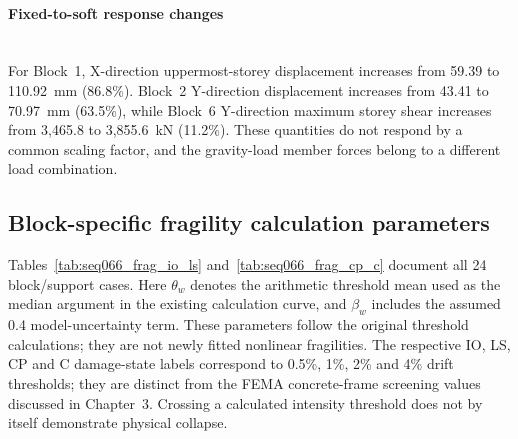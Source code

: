 \paragraph{Fixed-to-soft response changes}\mbox{}\\
\noindent For Block~1, X-direction uppermost-storey displacement increases from 59.39 to 110.92~mm (86.8\%). Block~2 Y-direction displacement increases from 43.41 to 70.97~mm (63.5\%), while Block~6 Y-direction maximum storey shear increases from 3,465.8 to 3,855.6~kN (11.2\%). These quantities do not respond by a common scaling factor, and the gravity-load member forces belong to a different load combination.



\subsection*{Block-specific fragility calculation parameters}
Tables~\ref{tab:seq066_frag_io_ls} and~\ref{tab:seq066_frag_cp_c} document all 24 block/support cases. Here $\theta_w$ denotes the arithmetic threshold mean used as the median argument in the existing calculation curve, and $\beta_w$ includes the assumed 0.4 model-uncertainty term. These parameters follow the original threshold calculations; they are not newly fitted nonlinear fragilities. The respective IO, LS, CP and C damage-state labels correspond to 0.5\%, 1\%, 2\% and 4\% drift thresholds; they are distinct from the FEMA concrete-frame screening values discussed in Chapter~3. Crossing a calculated intensity threshold does not by itself demonstrate physical collapse.
